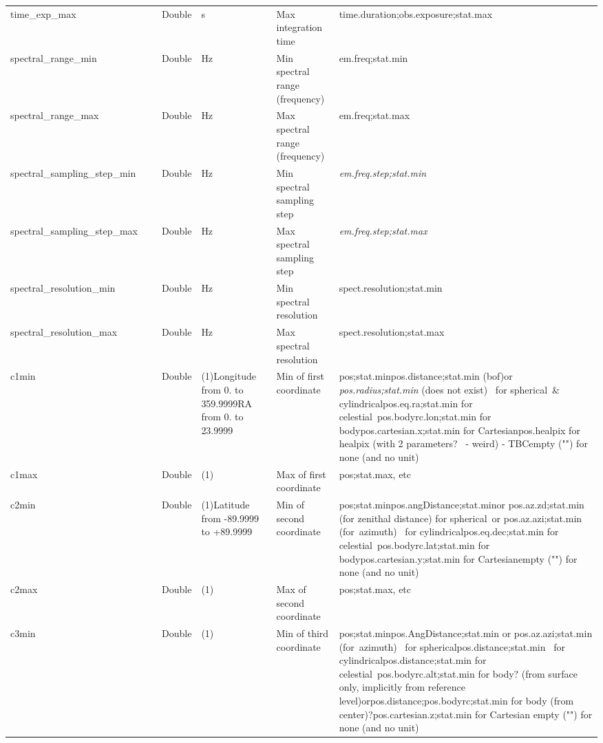 \documentclass[11pt,a4paper]{ivoa}
\begin{document}
\begin{longtable}{p{3.5cm}p{0.5cm}p{1cm}p{1cm}p{7cm}p{3cm}}
\\
time\_exp\_max& &Double&s&Max integration time&



time.duration;obs.exposure;stat.max











\\
spectral\_range\_min& &Double&Hz&Min spectral range (frequency)&em.freq;stat.min\\
spectral\_range\_max& &Double&Hz&Max spectral range (frequency)&em.freq;stat.max\\
spectral\_sampling\_step\_min& &Double&Hz&Min spectral sampling step&\emph{em.freq.step;stat.min} \\
spectral\_sampling\_step\_max& &Double&Hz&Max spectral sampling step&\emph{em.freq.step;stat.max }\\
spectral\_resolution\_min& &Double&Hz&Min spectral resolution&spect.resolution;stat.min\\
spectral\_resolution\_max& &Double&Hz&Max spectral resolution&spect.resolution;stat.max\\
c1min& &Double&(1)Longitude from 0. to 359.9999RA from 0. to 23.9999&Min of first coordinate&pos;stat.minpos.distance;stat.min (bof)or \emph{pos.radius;stat.min} (does not exist)  for spherical \& cylindricalpos.eq.ra;stat.min for celestial pos.bodyrc.lon;stat.min for bodypos.cartesian.x;stat.min for Cartesianpos.healpix for healpix (with 2 parameters?  - weird) - TBCempty ("") for none (and no unit)\\
c1max& &Double&(1) &Max of first coordinate&pos;stat.max, etc\\
c2min& &Double&(1)Latitude from -89.9999 to +89.9999&Min of second coordinate&pos;stat.minpos.angDistance;stat.minor pos.az.zd;stat.min (for zenithal distance) for spherical or pos.az.azi;stat.min (for azimuth)  for cylindricalpos.eq.dec;stat.min for celestial pos.bodyrc.lat;stat.min for bodypos.cartesian.y;stat.min for Cartesianempty ("") for none (and no unit)\\
c2max& &Double&(1)&Max of second coordinate&pos;stat.max, etc\\
c3min& &Double&(1)&Min of third coordinate&pos;stat.minpos.AngDistance;stat.min or pos.az.azi;stat.min (for azimuth)  for sphericalpos.distance;stat.min  for cylindricalpos.distance;stat.min for celestial pos.bodyrc.alt;stat.min for body? (from surface only, implicitly from reference level)orpos.distance;pos.bodyrc;stat.min for body (from center)?pos.cartesian.z;stat.min for Cartesian empty ("") for none (and no unit)\\

\end{longtable}
\end{document}

